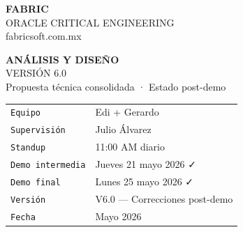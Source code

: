\documentclass[11pt, a4paper]{article}
\begin{document}

\begin{titlepage}
\pagecolor{bgbase}
\color{textpri}

\vspace*{3cm}

\begin{center}
  {\Huge\bfseries FABRIC}\\[0.4em]
  {\large\ttfamily\color{accent} ORACLE CRITICAL ENGINEERING}\\[0.2em]
  {\small\ttfamily\color{textsec} fabricsoft.com.mx}
\end{center}

\vspace{2cm}

\begin{center}
\end{center}

\vspace{1.5cm}

\begin{center}
  {\LARGE\bfseries ANÁLISIS Y DISEÑO}\\[0.6em]
  {\Large VERSIÓN 6.0}\\[0.4em]
  {\normalsize\color{textsec} Propuesta técnica consolidada · Estado post-demo}
\end{center}

\vspace{2cm}

\begin{center}
  \begin{tabular}{ll}
    \texttt{\color{textsec}Equipo}        & Edi + Gerardo\\[0.3em]
    \texttt{\color{textsec}Supervisión}   & Julio Álvarez\\[0.3em]
    \texttt{\color{textsec}Standup}       & 11:00 AM diario\\[0.3em]
    \texttt{\color{textsec}Demo intermedia} & Jueves 21 mayo 2026 {\color{accent}✓}\\[0.3em]
    \texttt{\color{textsec}Demo final}    & Lunes 25 mayo 2026 {\color{accent}✓}\\[0.3em]
    \texttt{\color{textsec}Versión}       & {\color{accent}V6.0 — Correcciones post-demo}\\[0.3em]
    \texttt{\color{textsec}Fecha}         & Mayo 2026\\
  \end{tabular}
\end{center}


\end{titlepage}
\end{document}

